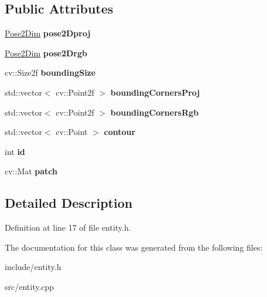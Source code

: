 \subsection*{Public Attributes}
\begin{DoxyCompactItemize}
\item 
\hypertarget{classpersonal_robotics_1_1_entity_a52956983d5bf259c6e115681b74b9cd7}{}\hyperlink{structpersonal_robotics_1_1_pose2_dim}{Pose2\+Dim} {\bfseries pose2\+Dproj}\label{classpersonal_robotics_1_1_entity_a52956983d5bf259c6e115681b74b9cd7}

\item 
\hypertarget{classpersonal_robotics_1_1_entity_a220369e40b5ec70baaf480cfc00bf474}{}\hyperlink{structpersonal_robotics_1_1_pose2_dim}{Pose2\+Dim} {\bfseries pose2\+Drgb}\label{classpersonal_robotics_1_1_entity_a220369e40b5ec70baaf480cfc00bf474}

\item 
\hypertarget{classpersonal_robotics_1_1_entity_a0fd72ac4d9be4655c513cad3ab51d6f0}{}cv\+::\+Size2f {\bfseries bounding\+Size}\label{classpersonal_robotics_1_1_entity_a0fd72ac4d9be4655c513cad3ab51d6f0}

\item 
\hypertarget{classpersonal_robotics_1_1_entity_a6ef89bf1c0ac50ba578c05d47796f9c3}{}std\+::vector$<$ cv\+::\+Point2f $>$ {\bfseries bounding\+Corners\+Proj}\label{classpersonal_robotics_1_1_entity_a6ef89bf1c0ac50ba578c05d47796f9c3}

\item 
\hypertarget{classpersonal_robotics_1_1_entity_aeb83acf1beec358b4f1afeb76451f5d5}{}std\+::vector$<$ cv\+::\+Point2f $>$ {\bfseries bounding\+Corners\+Rgb}\label{classpersonal_robotics_1_1_entity_aeb83acf1beec358b4f1afeb76451f5d5}

\item 
\hypertarget{classpersonal_robotics_1_1_entity_a1ff8f4ca0c615708eb1eb3893b28641b}{}std\+::vector$<$ cv\+::\+Point $>$ {\bfseries contour}\label{classpersonal_robotics_1_1_entity_a1ff8f4ca0c615708eb1eb3893b28641b}

\item 
\hypertarget{classpersonal_robotics_1_1_entity_a4158566751ae50f0382e53887e805309}{}int {\bfseries id}\label{classpersonal_robotics_1_1_entity_a4158566751ae50f0382e53887e805309}

\item 
\hypertarget{classpersonal_robotics_1_1_entity_ace41e4c1c277dd71e283219172ccbfbd}{}cv\+::\+Mat {\bfseries patch}\label{classpersonal_robotics_1_1_entity_ace41e4c1c277dd71e283219172ccbfbd}

\end{DoxyCompactItemize}


\subsection{Detailed Description}


Definition at line 17 of file entity.\+h.



The documentation for this class was generated from the following files\+:\begin{DoxyCompactItemize}
\item 
include/entity.\+h\item 
src/entity.\+cpp\end{DoxyCompactItemize}
